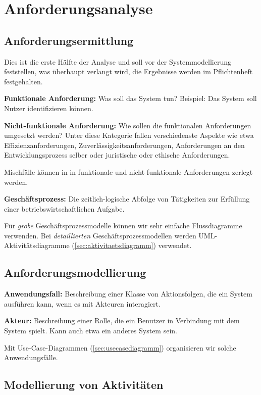 \documentclass[german]{panikzettel}
\begin{document}
\section{Anforderungsanalyse}

\subsection{Anforderungsermittlung}

Dies ist die erste Hälfte der Analyse und soll vor der Systemmodellierung feststellen, was überhaupt verlangt wird, die Ergebnisse werden im Pflichtenheft festgehalten.

\textbf{Funktionale Anforderung:} Was soll das System tun?
Beispiel: Das System soll Nutzer identifizieren können.

\textbf{Nicht-funktionale Anforderung:} Wie sollen die funktionalen Anforderungen umgesetzt werden?
Unter diese Kategorie fallen verschiedenste Aspekte wie etwa Effizienzanforderungen, Zuverlässigkeitsanforderungen, Anforderungen an den Entwicklungsprozess selber oder juristische oder ethische Anforderungen.

Mischfälle können in in funktionale und nicht-funktionale Anforderungen zerlegt werden.

\textbf{Geschäftsprozess:} Die zeitlich-logische Abfolge von Tätigkeiten zur Erfüllung einer betriebswirtschaftlichen Aufgabe.

Für \emph{grobe} Geschäftsprozessmodelle können wir sehr einfache Flussdiagramme verwenden.
Bei \emph{detaillierten} Geschäftsprozessmodellen werden UML-Aktivitätsdiagramme (\ref{sec:aktivitaetsdiagramm}) verwendet.

\subsection{Anforderungsmodellierung}

\textbf{Anwendungsfall:} Beschreibung einer Klasse von Aktionsfolgen, die ein System ausführen kann, wenn es mit Akteuren interagiert.

\textbf{Akteur:} Beschreibung einer Rolle, die ein Benutzer in Verbindung mit dem System spielt.
Kann auch etwa ein anderes System sein.

Mit Use-Case-Diagrammen (\ref{sec:usecasediagramm}) organisieren wir solche Anwendungsfälle.

\subsection{Modellierung von Aktivitäten}
\end{document}
